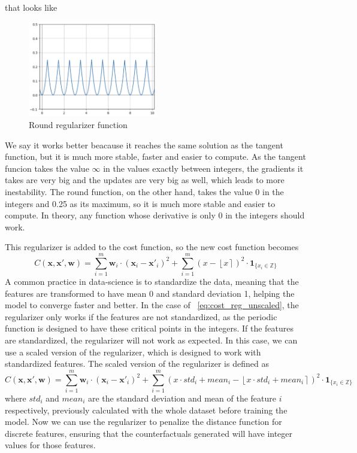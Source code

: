\documentclass[12pt]{extarticle}
\numberwithin{equation}{section}
\begin{document}
that looks like
\begin{figure}[H]
    \centering
    \includegraphics[width=0.5\textwidth]{images/round_integers}
    \caption{Round regularizer function}
    \label{fig:reg round}
\end{figure}
We say it works better beacause it reaches the same solution as the tangent function, but it is much more stable, faster and easier to compute. As the tangent funcion takes the value $\infty$ in the values exactly between integers, the gradients it takes are very big and the updates are very big as well, which leads to more inestability. The round function, on the other hand, takes the value 0 in the integers and 0.25 as its maximum, so it is much more stable and easier to compute. In theory, any function whose derivative is only 0 in the integers should work.

This regularizer is added to the cost function, so the new cost function becomes
\begin{equation}\label{eq:cost_reg_unscaled}
    C(\mathbf{x}, \mathbf{x}', \mathbf{w}) = \sum_{i=1}^{m} \mathbf{w}_i \cdot (\mathbf{x}_i - \mathbf{x}'_{i})^2 + \sum_{i=1}^{m} (x - \left\lfloor x \right\rceil )^2 \cdot \mathbf{1}_{\{x_{i}\in\mathbb{Z}\}}
\end{equation}
A common practice in data-science is to standardize the data, meaning that the features are transformed to have mean 0 and standard deviation 1, helping the model to converge faster and better. In the case of ~\eqref{eq:cost_reg_unscaled}, the regularizer only works if the features are not standardized, as the periodic function is designed to have these critical points in the integers. If the features are standardized, the regularizer will not work as expected. In this case, we can use a scaled version of the regularizer, which is designed to work with standardized features. The scaled version of the regularizer is defined as
\begin{equation}\label{eq:cost_reg_scaled}
    C(\mathbf{x}, \mathbf{x}', \mathbf{w}) = \sum_{i=1}^{m} \mathbf{w}_i \cdot (\mathbf{x}_i - \mathbf{x}'_{i})^2 + \sum_{i=1}^{m} (x \cdot std_i + mean_i - \left\lfloor x \cdot std_i + mean_i \right\rceil )^2 \cdot \mathbf{1}_{\{x_{i}\in\mathbb{Z}\}}
\end{equation}
where \(std_i\) and \(mean_i\) are the standard deviation and mean of the feature \(i\) respectively, previously calculated with the whole dataset before training the model. Now we can use the regularizer to penalize the distance function for discrete features, ensuring that the counterfactuals generated will have integer values for those features.
\end{document}
